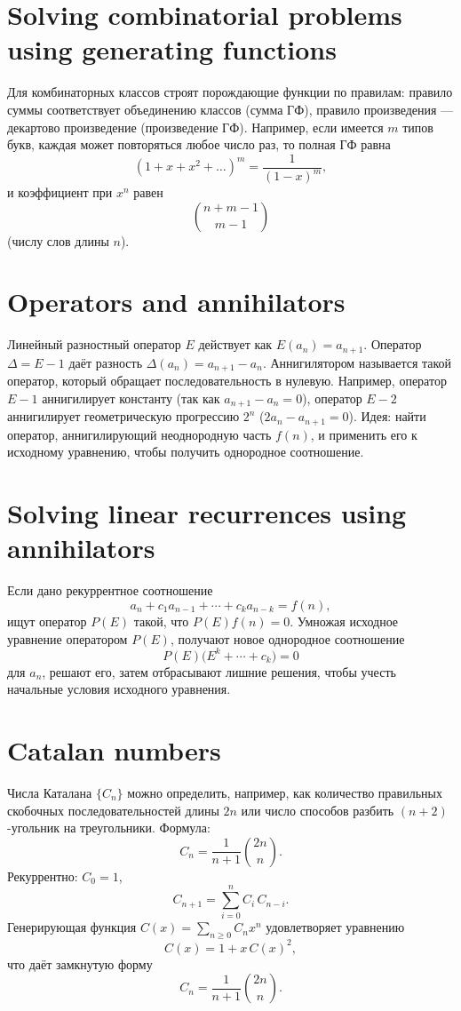 \documentclass{article}
\begin{document}
	\section{Solving combinatorial problems using generating functions}
	Для комбинаторных классов строят порождающие функции по правилам: правило суммы соответствует объединению классов (сумма ГФ), правило произведения --- декартово произведение (произведение ГФ). Например, если имеется $m$ типов букв, каждая может повторяться любое число раз, то полная ГФ равна 
	\[
	(1+x+x^2+\dots)^m = \frac{1}{(1-x)^m},
	\]
	и коэффициент при $x^n$ равен 
	\[
	\binom{n+m-1}{m-1}
	\]
	(числу слов длины $n$).
	
	\section{Operators and annihilators}
	Линейный разностный оператор $E$ действует как $E(a_n)=a_{n+1}$. Оператор $\Delta = E-1$ даёт разность $\Delta(a_n)=a_{n+1}-a_n$. Аннигилятором называется такой оператор, который обращает последовательность в нулевую. Например, оператор $E-1$ аннигилирует константу (так как $a_{n+1}-a_n=0$), оператор $E-2$ аннигилирует геометрическую прогрессию $2^n$ ($2a_{n} - a_{n+1}=0$). Идея: найти оператор, аннигилирующий неоднородную часть $f(n)$, и применить его к исходному уравнению, чтобы получить однородное соотношение.
	
	\section{Solving linear recurrences using annihilators}
	Если дано рекуррентное соотношение 
	\[
	a_n + c_1 a_{n-1} + \cdots + c_k a_{n-k} = f(n),
	\]
	ищут оператор $P(E)$ такой, что $P(E)f(n)=0$. Умножая исходное уравнение оператором $P(E)$, получают новое однородное соотношение 
	\[
	P(E)\bigl(E^k + \cdots + c_k\bigr)=0
	\]
	для $a_n$, решают его, затем отбрасывают лишние решения, чтобы учесть начальные условия исходного уравнения.
	
	\section{Catalan numbers}
	Числа Каталана $\{C_n\}$ можно определить, например, как количество правильных скобочных последовательностей длины $2n$ или число способов разбить $(n+2)$-угольник на треугольники. Формула:
	\[
	C_n = \frac{1}{n+1}\binom{2n}{n}.
	\]
	Рекуррентно: $C_0=1$, 
	\[
	C_{n+1} = \sum_{i=0}^n C_i\,C_{n-i}.
	\]
	Генерирующая функция $C(x)=\sum_{n\ge0}C_n x^n$ удовлетворяет уравнению 
	\[
	C(x)=1 + x\,C(x)^2,
	\]
	что даёт замкнутую форму 
	\[
	C_n = \frac{1}{n+1}\binom{2n}{n}.
	\]
	
\end{document}
